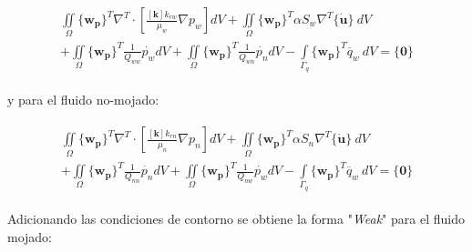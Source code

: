 \begin{ceqn} %
\begin{gather}\label{eq:equ397}
\begin{multlined}
\iint \limits_\Omega \{\mathbf{w_p}\}^T \nabla^T  \cdot \left[\frac{[\mathbf{k}] k_{rw}}{\mu_w}\nabla p_w\right] dV + 
\iint \limits_\Omega \{\mathbf{w_p}\}^T \alpha S_w \nabla^T \{\mathbf{\dot{u}}\}\ dV \\[4pt]
+\iint \limits_\Omega \{\mathbf{w_p}\}^T \frac{1}{Q_{ww}} \dot{p_w} dV 
+\iint \limits_\Omega \{\mathbf{w_p}\}^T \frac{1}{Q_{wn}} \dot{p_n} dV 
-\int \limits_{\Gamma_{q}} \{\mathbf{w_p}\}^T \overline{q}_w\ dV= \{\mathbf{0}\}
\end{multlined}
\end{gather}   
\end{ceqn}

y para el fluido no-mojado:

\begin{ceqn} %
\begin{gather}\label{eq:equ398}
\begin{multlined}
\iint \limits_\Omega \{\mathbf{w_p}\}^T \nabla^T \cdot \left[\frac{[\mathbf{k}] k_{rn}}{\mu_n}\nabla p_n\right] dV + 
\iint \limits_\Omega \{\mathbf{w_p}\}^T \alpha S_n \nabla^T \{\mathbf{\dot{u}}\}\ dV \\[4pt]
+\iint \limits_\Omega \{\mathbf{w_p}\}^T \frac{1}{Q_{nn}} \dot{p_n} dV 
+\iint \limits_\Omega \{\mathbf{w_p}\}^T \frac{1}{Q_{nw}} \dot{p_w} dV 
-\int \limits_{\Gamma_{q}} \{\mathbf{w_p}\}^T \overline{q}_w\ dV= \{\mathbf{0}\}
\end{multlined}
\end{gather}   
\end{ceqn}
\bigskip
Adicionando las condiciones de contorno se obtiene la forma "\textit{Weak}" para el fluido mojado:

